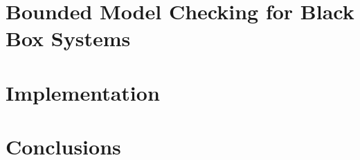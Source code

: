\documentclass{sig-alternate}
\begin{document}
\section{Bounded Model Checking for Black Box Systems}
\label{sec:bmc}



\section{Implementation}
\label{sec:impl}


% 

\section{Conclusions}
\label{sec:concl}





% 
\end{document}
